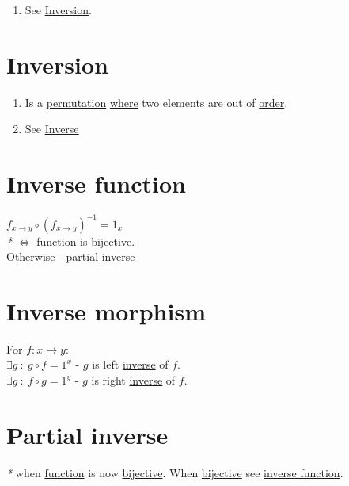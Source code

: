 \documentclass[a4paper,14pt,oneside]{book}
\begin{document}
{\begin{enumerate}
\item See \hyperref[org7a4d86a]{Inversion}.\\
\end{enumerate}

\chapter{\label{org7a4d86a}Inversion}
\label{sec:org4c9720a}

\begin{enumerate}
\item Is a \hyperref[org0dbeeba]{permutation} \hyperref[org5b6b021]{where} two elements are out of \hyperref[orgb3255b0]{order}.\\

\item See \hyperref[org5ab3e3c]{Inverse}\\
\end{enumerate}

\chapter{\label{orgf750cc9}Inverse function}
\label{sec:org36e6614}

\(f_{x \to y} \circ ({f_{x \to y}})^{-1} = {1}_{x}\)\\

\emph{*} \(\iff\) \hyperref[org6a60524]{function} is \hyperref[org223f583]{bijective}.\\
Otherwise - \hyperref[orgbbd1b19]{partial inverse}\\

\chapter{\label{org0c21660}Inverse morphism}
\label{sec:org395fa62}
For \(f: x \to y\):\\
\(\exists g \ : \ g \circ f = 1^{x}\) - \(g\) is left \hyperref[org5ab3e3c]{inverse} of \(f\).\\
\(\exists g \ : \ f \circ g = 1^{y}\) - \(g\) is right \hyperref[org5ab3e3c]{inverse} of \(f\).\\

\chapter{\label{orgbbd1b19}Partial inverse}
\label{sec:org2f3a27f}

\emph{*} when \hyperref[org6a60524]{function} is now \hyperref[org223f583]{bijective}. When \hyperref[org223f583]{bijective} see \hyperref[orgf750cc9]{inverse function}.\\

}
\end{document}
